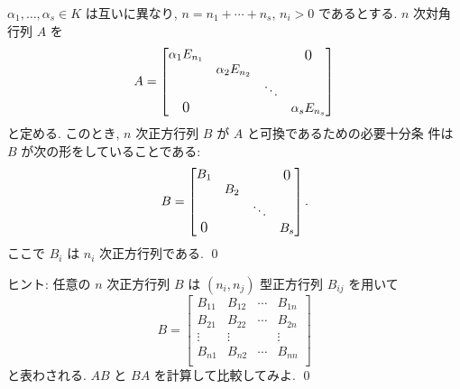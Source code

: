 \documentclass[12pt,twoside]{jarticle}
\begin{document}
\begin{question}
\label{q:B-commutes-semisimple-A}
  $\alpha_1,\dots,\alpha_s\in K$ は互いに異なり, 
  $n=n_1+\cdots+n_s$, $n_i>0$ であるとする.  $n$ 次対角行列 $A$ を
  \begin{equation*}
    A =
    \begin{bmatrix}
      \alpha_1 E_{n_1} &                  &        & \bigzerou \\
                       & \alpha_2 E_{n_2} &        & \\
                       &                  & \ddots & \\
      \bigzerol        &                  &        & \alpha_s E_{n_s} \\
    \end{bmatrix}
  \end{equation*}
  と定める. このとき, $n$ 次正方行列 $B$ が $A$ と可換であるための必要十分条
  件は $B$ が次の形をしていることである:
  \begin{equation*}
    B = 
    \begin{bmatrix}
      B_1       &     &        & \bigzerou \\
                & B_2 &        & \\
                &     & \ddots & \\
      \bigzerol &     &        & B_s \\
    \end{bmatrix}.
  \end{equation*}
  ここで $B_i$ は $n_i$ 次正方行列である. \qed
\end{question}

\noindent
ヒント: 任意の $n$ 次正方行列 $B$ は $(n_i,n_j)$ 型正方行列 $B_{ij}$ を用いて
\begin{equation*}
  B =
  \begin{bmatrix}
    B_{11} & B_{12} & \cdots & B_{1n} \\
    B_{21} & B_{22} & \cdots & B_{2n} \\
    \vdots & \vdots &        & \vdots \\
    B_{n1} & B_{n2} & \cdots & B_{nn} \\
  \end{bmatrix}
\end{equation*}
と表わされる.  $AB$ と $BA$ を計算して比較してみよ.
\qed

\medskip
\end{document}
